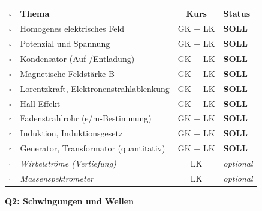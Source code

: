 \documentclass[11pt,a4paper]{article}
\newcommand{\checkbox}{$\square$}
\begin{document}
\begin{tabularx}{\textwidth}{c|l|c|X}
\rowcolor{lightblue}
\checkbox & \textbf{Thema} & \textbf{Kurs} & \textbf{Status} \\
\hline
\checkbox & Homogenes elektrisches Feld & GK + LK & \textbf{SOLL} \\
\rowcolor{lightgray}
\checkbox & Potenzial und Spannung & GK + LK & \textbf{SOLL} \\
\checkbox & Kondensator (Auf-/Entladung) & GK + LK & \textbf{SOLL} \\
\rowcolor{lightgray}
\checkbox & Magnetische Feldstärke B & GK + LK & \textbf{SOLL} \\
\checkbox & Lorentzkraft, Elektronenstrahlablenkung & GK + LK & \textbf{SOLL} \\
\rowcolor{lightgray}
\checkbox & Hall-Effekt & GK + LK & \textbf{SOLL} \\
\checkbox & Fadenstrahlrohr (e/m-Bestimmung) & GK + LK & \textbf{SOLL} \\
\rowcolor{lightgray}
\checkbox & Induktion, Induktionsgesetz & GK + LK & \textbf{SOLL} \\
\checkbox & Generator, Transformator (quantitativ) & GK + LK & \textbf{SOLL} \\
\rowcolor{lightgray}
\checkbox & \textit{Wirbelströme (Vertiefung)} & LK & \textit{optional} \\
\checkbox & \textit{Massenspektrometer} & LK & \textit{optional} \\
\hline
\end{tabularx}

\vspace{0.4cm}

\begin{center}
\textbf{Q2: Schwingungen und Wellen}
\end{center}
\end{document}
